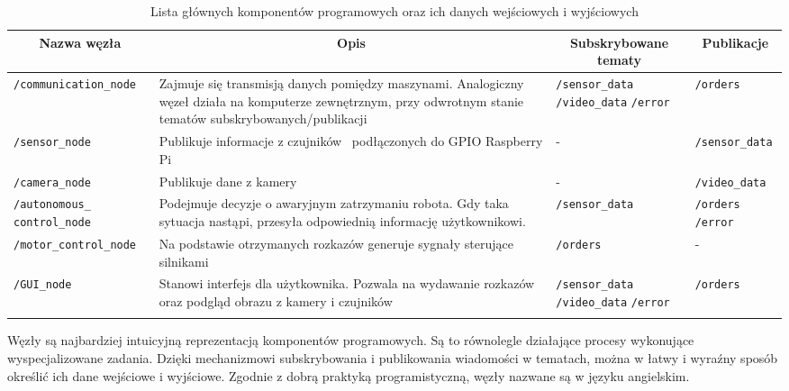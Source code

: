 \documentclass[a4paper]{article}
\begin{document}
\begin{table}[H]
\begin{center}
\begin{tabular}[t]{ | p{3.5cm} | p{7cm} | p{3cm} | p{3cm} | } 
\multicolumn{1}{c}{Nazwa węzła} & \multicolumn{1}{c}{Opis} & 
\multicolumn{1}{c}{Subskrybowane tematy} & \multicolumn{1}{c}{Publikacje} \\
\hline \verb|/communication_node| & Zajmuje się transmisją danych pomiędzy maszynami. Analogiczny węzeł działa na komputerze zewnętrznym, przy odwrotnym stanie tematów subskrybowanych/publikacji & \verb|/sensor_data| \verb|/video_data| \verb|/error| & \verb|/orders|\\
\hline \verb|/sensor_node| & Publikuje informacje z czujników \ podłączonych do GPIO Raspberry Pi & - & \verb|/sensor_data| \\ 
\hline \verb|/camera_node| & Publikuje dane z kamery & - & \verb|/video_data|\\
\hline \verb|/autonomous_| \verb|control_node| & Podejmuje decyzje o awaryjnym zatrzymaniu robota. Gdy taka sytuacja nastąpi, przesyła odpowiednią informację użytkownikowi. & \verb|/sensor_data| & \verb|/orders| \verb|/error|\\
\hline \verb|/motor_control_node| & Na podstawie otrzymanych rozkazów generuje sygnały sterujące silnikami & \verb|/orders| & - \\
\hline \verb|/GUI_node| & Stanowi interfejs dla użytkownika. Pozwala na wydawanie rozkazów oraz podgląd obrazu z kamery i czujników & \verb|/sensor_data| \verb|/video_data| \verb|/error| & \verb|/orders| \\
\hline
\multicolumn{1}{c}{} & \multicolumn{1}{l}{} & 
\multicolumn{1}{l}{} & \multicolumn{1}{c}{} \\ 
\end{tabular}
\caption{Lista głównych komponentów programowych oraz ich danych wejściowych i wyjściowych }
\end{center}
\end{table}


Węzły są najbardziej intuicyjną reprezentacją komponentów programowych. Są to równolegle działające procesy wykonujące wyspecjalizowane zadania. Dzięki mechanizmowi subskrybowania i publikowania wiadomości w tematach, można w łatwy i wyraźny sposób określić ich dane wejściowe i wyjściowe. Zgodnie z dobrą praktyką programistyczną, węzły nazwane są w języku angielskim. 
\end{document}

